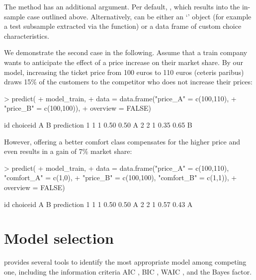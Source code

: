 \documentclass[article]{jss}
\newcommand{\class}[1]{`\code{#1}'}
\newcommand{\fct}[1]{\code{#1()}}
\begin{document}
The \fct{predict} method has an additional  argument. Per default, , which results into the in-sample case outlined above. Alternatively,  can be either an \class{RprobitB\_data} object (for example a test subsample extracted via the \fct{train\_test} function) or a data frame of custom choice characteristics.

We demonstrate the second case in the following. Assume that a train company wants to anticipate the effect of a price increase on their market share. By our model, increasing the ticket price from 100 euros to 110 euros (ceteris paribus) draws 15\% of the customers to the competitor who does not increase their prices:

\begin{Schunk}
\begin{Sinput}
> predict(
+    model_train,
+    data = data.frame("price_A" = c(100,110),
+                      "price_B" = c(100,100)),
+    overview = FALSE)
\end{Sinput}
\begin{Soutput}
  id choiceid    A    B prediction
1  1        1 0.50 0.50          A
2  2        1 0.35 0.65          B
\end{Soutput}
\end{Schunk}

However, offering a better comfort class compensates for the higher price and even results in a gain of 7\% market share:

\begin{Schunk}
\begin{Sinput}
> predict(
+    model_train,
+    data = data.frame("price_A" = c(100,110), "comfort_A" = c(1,0),
+                      "price_B" = c(100,100), "comfort_B" = c(1,1)),
+    overview = FALSE)
\end{Sinput}
\begin{Soutput}
  id choiceid    A    B prediction
1  1        1 0.50 0.50          A
2  2        1 0.57 0.43          A
\end{Soutput}
\end{Schunk}

\section{Model selection} \label{sec:model_selection}

 provides several tools to identify the most appropriate model among competing one, including the information criteria AIC \citep{Akaike:1974}, BIC \citep{Schwarz:1978}, WAIC \citep{Watanabe:2010}, and the Bayes factor.
\end{document}
